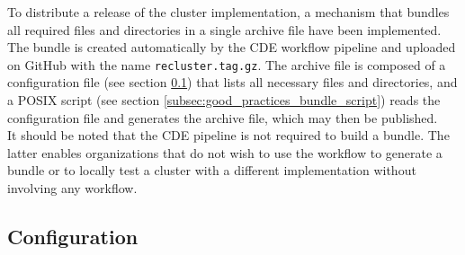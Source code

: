 To distribute a release of the cluster implementation, a mechanism that bundles all
required files and directories in a single archive file have been implemented.
The bundle is created automatically by the CDE workflow pipeline and uploaded on
GitHub with the name \texttt{recluster.tag.gz}. The archive file is composed of
a configuration file (see section \ref{subsec:good_practices_bundle_configuration})
that lists all necessary files and directories, and a POSIX script (see section
\ref{subsec:good_practices_bundle_script}) reads the configuration file and generates
the archive file, which may then be published. \\ %
It should be noted that the CDE pipeline is not required to build a bundle. The latter
enables organizations that do not wish to use the workflow to generate a bundle or
to locally test a cluster with a different implementation without involving any workflow.

\subsection{Configuration}
\label{subsec:good_practices_bundle_configuration}

